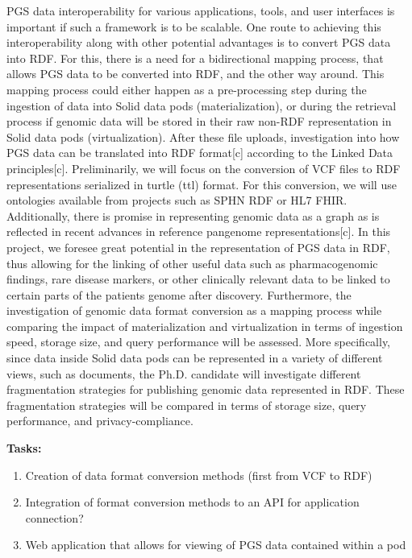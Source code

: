 \documentclass[11pt]{article}
\begin{document}
PGS data interoperability for various applications, tools, and user interfaces is important if such a framework is to be scalable. 
One route to achieving this interoperability along with other potential advantages is to convert PGS data into RDF. For this, there is a need for a bidirectional mapping process, that allows PGS data to be converted into RDF, and the other way around. 
This mapping process could either happen as a pre-processing step during the ingestion of data into Solid data pods (materialization), or during the retrieval process if genomic data will be stored in their raw non-RDF representation in Solid data pods (virtualization).
After these file uploads, investigation into how PGS data can be translated into RDF format[c] according to the Linked Data principles[c]. 
Preliminarily, we will focus on the conversion of VCF files to RDF representations serialized in turtle (ttl) format. 
For this conversion, we will use ontologies available from projects such as SPHN RDF or HL7 FHIR. 
Additionally, there is promise in representing genomic data as a graph as is reflected in recent advances in reference pangenome representations[c]. 
In this project, we foresee great potential in the representation of PGS data in RDF, thus allowing for the linking of other useful data such as pharmacogenomic findings, rare disease markers, or other clinically relevant data to be linked to certain parts of the patient\textquotesingle s genome after discovery. 
Furthermore, the investigation of genomic data format conversion as a mapping process while comparing the impact of materialization and virtualization in terms of ingestion speed, storage size, and query performance will be assessed. 
More specifically, since data inside Solid data pods can be represented in a variety of different views, such as documents, the Ph.D. candidate will investigate different fragmentation strategies for publishing genomic data represented in RDF. 
These fragmentation strategies will be compared in terms of storage size, query performance, and privacy-compliance.

\textbf{Tasks:} 
\begin{enumerate}
	\item Creation of data format conversion methods (first from VCF to RDF)
	\item Integration of format conversion methods to an API for application connection?
	\item Web application that allows for viewing of PGS data contained within a pod
\end{enumerate}
\end{document}
